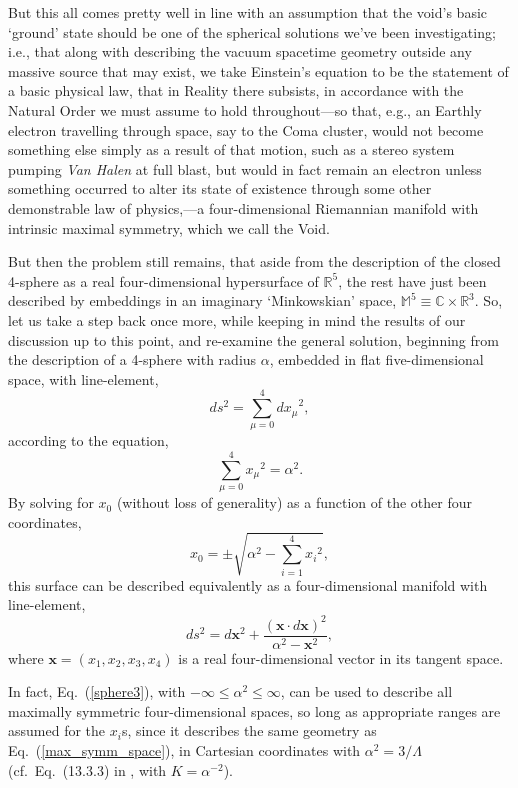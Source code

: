 But this all comes pretty well in line with an assumption that the void's basic `ground' state should be one of the spherical solutions we've been investigating; i.e., that along with describing the vacuum spacetime geometry outside any massive source that may exist, we take Einstein's equation to be the statement of a basic physical law, that in Reality there subsists, in accordance with the Natural Order we must assume to hold throughout---so that, e.g., an Earthly electron travelling through space, say to the Coma cluster, would not become something else simply as a result of that motion, such as a stereo system pumping \textit{Van Halen} at full blast, but would in fact remain an electron unless something occurred to alter its state of existence through some other demonstrable law of physics,---a four-dimensional Riemannian manifold with intrinsic maximal symmetry, which we call the Void.

But then the problem still remains, that aside from the description of the closed 4-sphere as a real four-dimensional hypersurface of $\mathbb{R}^5$, the rest have just been described by embeddings in an imaginary `Minkowskian' space, $\mathbb{M}^5\equiv\mathbb{C}\times\mathbb{R}^3$. So, let us take a step back once more, while keeping in mind the results of our discussion up to this point, and re-examine the general solution, beginning from the description of a 4-sphere with radius $\alpha$, embedded in flat five-dimensional space, with line-element,
\begin{equation}
ds^2=\sum_{\mu=0}^{4}{dx_{\mu}}^2,\label{R5}
\end{equation}
according to the equation,
\begin{equation}
\sum_{\mu=0}^4{x_{\mu}}^2=\alpha^2.\label{sphere1}
\end{equation}
By solving for $x_0$ (without loss of generality) as a function of the other four coordinates,
\begin{equation}
x_0=\pm\sqrt{\alpha^2-\sum_{i=1}^4{x_i}^2},\label{sphere2}
\end{equation}
this surface can be described equivalently as a four-dimensional manifold with line-element,
\begin{equation}
ds^2=d\mathbf{x}^2+\frac{(\mathbf{x}\cdot{d\mathbf{x}})^2}{\alpha^2-\mathbf{x}^2},\label{sphere3}
\end{equation}
where $\mathbf{x}=(x_1,x_2,x_3,x_4)$ is a real four-dimensional vector in its tangent space.

In fact, Eq.~(\ref{sphere3}), with $-\infty\leq\alpha^2\leq\infty$, can be used to describe all maximally symmetric four-dimensional spaces, so long as appropriate ranges are assumed for the $x_i$s, since it describes the same geometry as Eq.~(\ref{max_symm_space}), in Cartesian coordinates with $\alpha^2=3/\Lambda$ (cf.~Eq.~(13.3.3) in \cite{Weinberg1972}, with $K=\alpha^{-2}$). 


